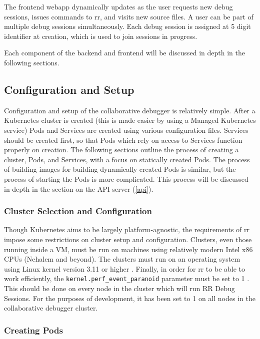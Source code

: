 \documentclass[12pt]{article}
\begin{document}
The frontend webapp dynamically updates as the user requests new debug
sessions, issues commands to rr, and visits new source files.  A user
can be part of multiple debug sessions simultaneously.  Each debug
session is assigned at 5 digit identifier at creation, which is used
to join sessions in progress.
\par

Each component of the backend and frontend will be discussed in depth
in the following sections.

\subsection{Configuration and Setup}

Configuration and setup of the collaborative debugger is relatively
simple.  After a Kubernetes cluster is created (this is made easier by
using a Managed Kubernetes service) Pods and Services are created
using various configuration files.  Services should be created first,
so that Pods which rely on access to Services function properly on
creation.  The following sections outline the process of creating a
cluster, Pods, and Services, with a focus on statically created Pods.
The process of building images for building dynamically created Pods
is similar, but the process of starting the Pods is more complicated.
This process will be discussed in-depth in the section on the API
server (\ref{api}).

\subsubsection{Cluster Selection and Configuration}

Though Kubernetes aims to be largely platform-agnostic, the
requirements of rr impose some restrictions on cluster setup and
configuration.  Clusters, even those running inside a VM, must be run
on machines using relatively modern Intel x86 CPUs (Nehalem and
beyond).  The clusters must run on an operating system using Linux
kernel version 3.11 or higher \cite{rr-repo}.  Finally, in order for
rr to be able to work efficiently, the
\lstinline{kernel.perf_event_paranoid} parameter must be set to 1
\cite{rr-repo}.  This should be done on every node in the cluster
which will run RR Debug Sessions.  For the purposes of development, it
has been set to 1 on all nodes in the collaborative debugger cluster.

\subsubsection{Creating Pods}
\end{document}
